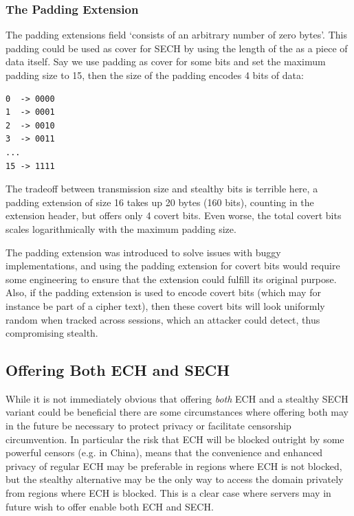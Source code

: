 \subsubsection{The Padding Extension}
The padding extensions  field `consists of an arbitrary number of zero bytes'.
This padding could be used as cover for SECH by using the length of the  as a piece
of data itself. Say we use padding as cover for some bits and set the maximum padding size to 15, then
the size of the padding encodes 4 bits of data:
\begin{verbatim}
0  -> 0000
1  -> 0001
2  -> 0010
3  -> 0011
...
15 -> 1111
\end{verbatim}

The tradeoff between transmission size and stealthy bits is terrible here,
a padding extension of size 16 takes up 20 bytes (160 bits),
counting in the extension header, but offers only 4 covert bits.
Even worse, the total covert bits scales logarithmically with the maximum padding size.

The padding extension was introduced to solve issues with buggy implementations, and using
the padding extension for covert bits would require some engineering to ensure that the extension
could fulfill its original purpose.
Also, if the padding extension is used to encode covert bits (which may for instance be part of a cipher text),
then these covert bits will look uniformly random when tracked across sessions, which an attacker
could detect, thus compromising stealth.


\subsection{Offering Both ECH and SECH}
While it is not immediately obvious that offering {\em both} \ac{ECH} and a stealthy \ac{SECH} variant could be beneficial there are some circumstances where offering both may in the future be necessary to protect privacy or facilitate censorship circumvention.
In particular the risk that \ac{ECH} will be blocked outright by some powerful censors (e.g. in China),
means that the convenience and enhanced privacy of regular ECH may be preferable in regions where ECH is not blocked,
but the stealthy alternative may be the only way to access the domain privately from regions where \ac{ECH} is blocked.
This is a clear case where servers may in future wish to offer enable both \ac{ECH} and \ac{SECH}.

